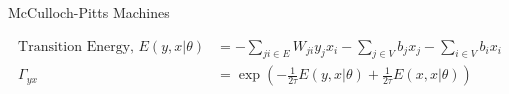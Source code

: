 \documentclass[10pt,appendixnumberbeamer]{beamer}
\begin{document}
\begin{frame}{McCulloch-Pitts Machines}
\begin{figure}[h]
\end{figure}
\begin{align*}
\text{Transition Energy, }E(y,x|\theta) &= -\sum_{ji \in E}W_{ji}y_jx_i- \sum_{j \in V}b_j x_j- \sum_{i \in V}b_i x_i\\
\Gamma_{yx} &=\exp\left(-\frac{1}{2\tau}E(y,x|\theta)+\frac{1}{2\tau}E(x,x|\theta)\right)\\
\end{align*}
\note{
\scriptsize
}
\end{frame}
\end{document}
